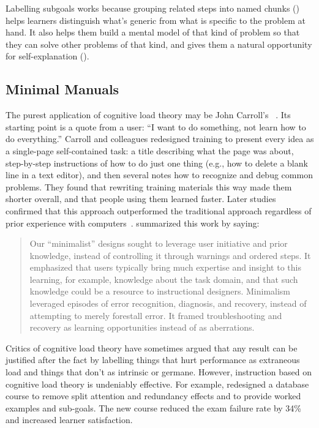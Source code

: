 Labelling subgoals works because grouping related steps into named chunks ()
helps learners distinguish what's generic from what is specific to the problem at hand.
It also helps them build a mental model of that kind of problem
so that they can solve other problems of that kind,
and gives them a natural opportunity for self-explanation ().

\subsection*{Minimal Manuals}

The purest application of cognitive load theory may be John Carroll's
~\cite{Carr1987,Carr2014}.
Its starting point is a quote from a user:
``I want to do something, not learn how to do everything.''
Carroll and colleagues redesigned training to present every idea as a single-page self-contained task:
a title describing what the page was about,
step-by-step instructions of how to do just one thing
(e.g., how to delete a blank line in a text editor),
and then several notes how to recognize and debug common problems.
They found that rewriting training materials this way made them shorter overall,
and that people using them learned faster.
Later studies confirmed that this approach outperformed the traditional approach
regardless of prior experience with computers~\cite{Lazo1993}.
\cite{Carr2014} summarized this work by saying:

\begin{quote}

  Our ``minimalist'' designs sought to leverage user initiative and prior knowledge,
  instead of controlling it through warnings and ordered steps.
  It emphasized that users typically bring much expertise and insight to this learning,
  for example,
  knowledge about the task domain,
  and that such knowledge could be a resource to instructional designers.
  Minimalism leveraged episodes of error recognition, diagnosis, and recovery,
  instead of attempting to merely forestall error.
  It framed troubleshooting and recovery as learning opportunities instead of as aberrations.

\end{quote}


Critics of cognitive load theory have sometimes argued that
any result can be justified after the fact by labelling things that hurt performance as extraneous load
and things that don't as intrinsic or germane.
However,
instruction based on cognitive load theory is undeniably effective.
For example,
\cite{Maso2016} redesigned a database course to remove split attention and redundancy effects
and to provide worked examples and sub-goals.
The new course reduced the exam failure rate by 34\%
and increased learner satisfaction.

